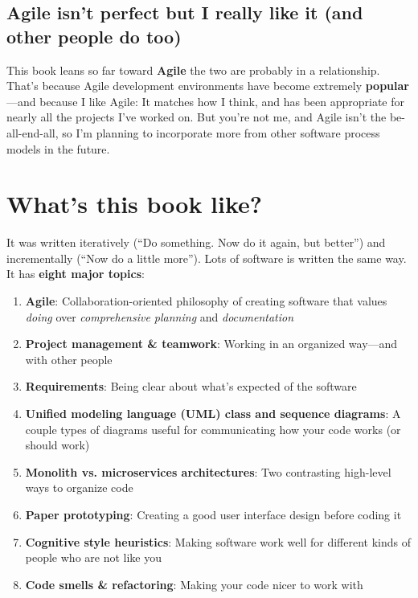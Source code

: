\subsection{Agile isn't perfect but I really like it (and other people do too)}
This book leans so far toward \textbf{Agile} the two are probably in a relationship. That's because Agile development environments have become extremely \textbf{popular}---and because I like Agile: It matches how I think, and has been appropriate for nearly all the projects I've worked on. But you're not me, and Agile isn't the be-all-end-all, so I'm planning to incorporate more from other software process models in the future.

\section{What's this book like?}

It was written iteratively (``Do something. Now do it again, but better'') and incrementally (``Now do a little more''). Lots of software is written the same way. \\

\noindent It has \textbf{eight major topics}:

\begin{enumerate}
    \item \textbf{Agile}: Collaboration-oriented philosophy of creating software that values \textit{doing} over \textit{comprehensive planning} and \textit{documentation}
    \item \textbf{Project management \& teamwork}: Working in an organized way---and with other people
    \item \textbf{Requirements}: Being clear about what's expected of the software
    \item \textbf{Unified modeling language (UML) class and sequence diagrams}: A couple types of diagrams useful for communicating how your code works (or should work)
    \item \textbf{Monolith vs. microservices architectures}: Two contrasting high-level ways to organize code
    \item \textbf{Paper prototyping}: Creating a good user interface design before coding it
    \item \textbf{Cognitive style heuristics}: Making software work well for different kinds of people who are not like you
    \item \textbf{Code smells \& refactoring}: Making your code nicer to work with
\end{enumerate}

